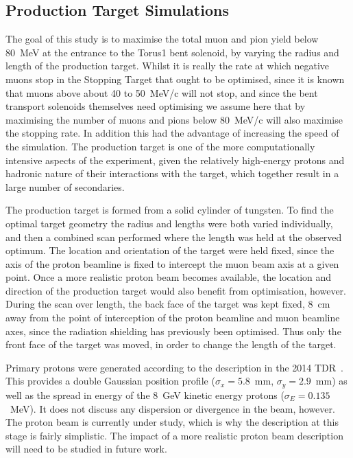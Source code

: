 \subsection{Production Target Simulations} 
The goal of this study is to maximise the total muon and pion
yield below 80~MeV at the entrance to the Torus1 bent solenoid, by varying the
radius and length of the production target.
Whilst it is really the rate at which negative muons stop in the Stopping Target that ought to be optimised, 
since it is known that muons above about 40 to 50~MeV/c will not stop, and since the bent transport solenoids themselves need optimising
we assume here that by maximising the number of muons and pions below 80~MeV/c will also maximise the stopping rate.
In addition this had the advantage of increasing the speed of the simulation.
The production target is one of the more computationally intensive aspects
of the experiment, given the relatively high-energy protons and hadronic nature of their interactions with the target, which together result in a large number of secondaries.

The production target is formed from a solid cylinder of tungsten.
To find the optimal target geometry the radius and lengths were both varied individually, and then a combined scan performed where the length was held at the observed optimum. 
The location and orientation of the target were held fixed, since the axis of the proton beamline is fixed to intercept the muon beam axis
at a given point.  Once a more realistic proton beam becomes available, the location and direction of the production target
would also benefit from optimisation, however.  During the scan over
length, the back face of the target was kept fixed, 8~cm away from the point of interception of the proton beamline and muon beamline axes,
since the radiation shielding has previously been optimised.
Thus only the front face of the target was moved, in order to change the length of the target.

Primary protons were generated according to the description in the 2014 \phaseI TDR~\cite{TDR2014}.
This provides a double Gaussian position profile ($\sigma_x=5.8$~mm, $\sigma_y=2.9$~mm) as well as the spread in energy of the 8~GeV kinetic energy protons ($\sigma_E=0.135$~MeV).
It does not discuss any dispersion or divergence in the beam, however.
The proton beam is currently under study, which is why the description at this stage is fairly simplistic.
The impact of a more realistic proton beam description will need to be studied in future work.

